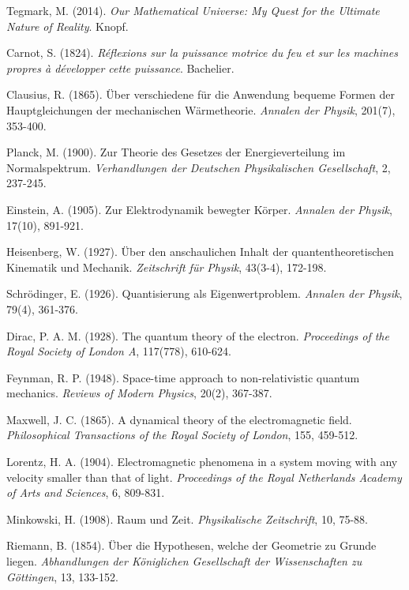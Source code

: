 \documentclass[12pt,a4paper]{article}
\begin{document}
\begin{thebibliography}{99}
Tegmark, M. (2014). \textit{Our Mathematical Universe: My Quest for the Ultimate Nature of Reality}. Knopf.

Carnot, S. (1824). \textit{Réflexions sur la puissance motrice du feu et sur les machines propres à développer cette puissance}. Bachelier.

Clausius, R. (1865). Über verschiedene für die Anwendung bequeme Formen der Hauptgleichungen der mechanischen Wärmetheorie. \textit{Annalen der Physik}, 201(7), 353-400.

Planck, M. (1900). Zur Theorie des Gesetzes der Energieverteilung im Normalspektrum. \textit{Verhandlungen der Deutschen Physikalischen Gesellschaft}, 2, 237-245.

Einstein, A. (1905). Zur Elektrodynamik bewegter Körper. \textit{Annalen der Physik}, 17(10), 891-921.

Heisenberg, W. (1927). Über den anschaulichen Inhalt der quantentheoretischen Kinematik und Mechanik. \textit{Zeitschrift für Physik}, 43(3-4), 172-198.

Schrödinger, E. (1926). Quantisierung als Eigenwertproblem. \textit{Annalen der Physik}, 79(4), 361-376.

Dirac, P. A. M. (1928). The quantum theory of the electron. \textit{Proceedings of the Royal Society of London A}, 117(778), 610-624.

Feynman, R. P. (1948). Space-time approach to non-relativistic quantum mechanics. \textit{Reviews of Modern Physics}, 20(2), 367-387.

Maxwell, J. C. (1865). A dynamical theory of the electromagnetic field. \textit{Philosophical Transactions of the Royal Society of London}, 155, 459-512.

Lorentz, H. A. (1904). Electromagnetic phenomena in a system moving with any velocity smaller than that of light. \textit{Proceedings of the Royal Netherlands Academy of Arts and Sciences}, 6, 809-831.

Minkowski, H. (1908). Raum und Zeit. \textit{Physikalische Zeitschrift}, 10, 75-88.

Riemann, B. (1854). Über die Hypothesen, welche der Geometrie zu Grunde liegen. \textit{Abhandlungen der Königlichen Gesellschaft der Wissenschaften zu Göttingen}, 13, 133-152.


\end{thebibliography}
\end{document}

